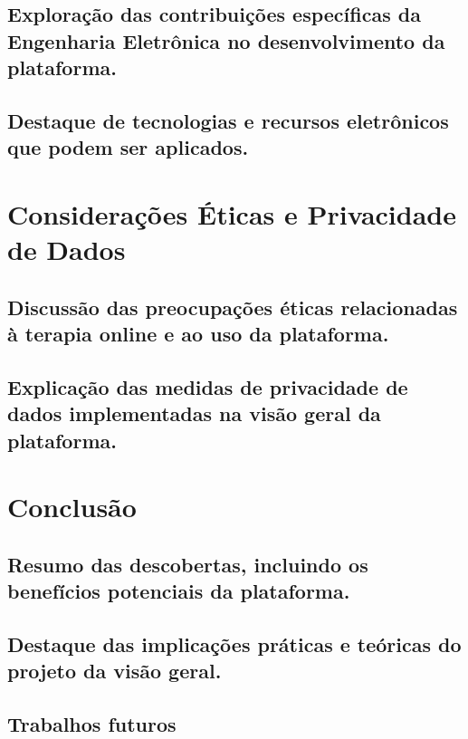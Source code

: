 \subsection{Exploração das contribuições específicas da Engenharia Eletrônica no desenvolvimento da plataforma.}
\subsection{Destaque de tecnologias e recursos eletrônicos que podem ser aplicados.}
\section{Considerações Éticas e Privacidade de Dados}
\subsection{Discussão das preocupações éticas relacionadas à terapia online e ao uso da plataforma.}
\subsection{Explicação das medidas de privacidade de dados implementadas na visão geral da plataforma.}
\section{Conclusão}
\subsection{Resumo das descobertas, incluindo os benefícios potenciais da plataforma.}
\subsection{Destaque das implicações práticas e teóricas do projeto da visão geral.}
\subsection{Trabalhos futuros}



